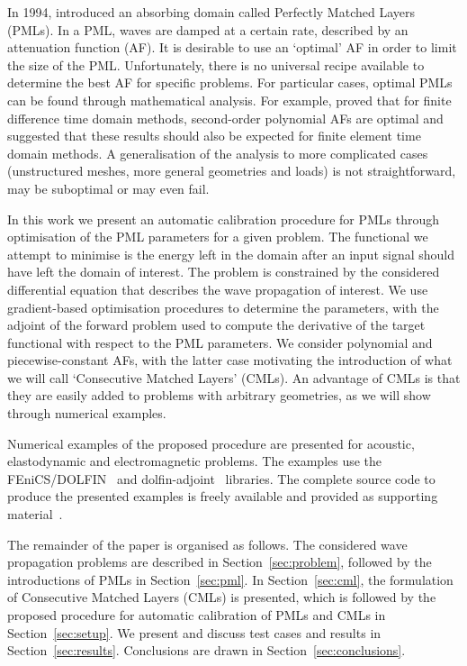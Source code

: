 \documentclass[a4paper]{article}
\begin{document}
In 1994, \citet{berenger94} introduced an absorbing domain called
Perfectly Matched Layers (PMLs).  In a PML, waves are damped at a
certain rate, described by an attenuation function (AF). It is
desirable to use an `optimal' AF in order to limit the size of the
PML.  Unfortunately, there is no universal recipe available to
determine the best AF for specific problems. For particular cases,
optimal PMLs can be found through mathematical analysis. For example,
\citet{chew96jin} proved that for finite difference time domain
methods, second-order polynomial AFs are optimal and suggested that
these results should also be expected for finite element time domain
methods. A generalisation of the analysis to more complicated cases
(unstructured meshes, more general geometries and loads) is not
straightforward, may be suboptimal or may even fail.

In this work we present an automatic calibration procedure for PMLs
through optimisation of the PML parameters for a given problem. The
functional we attempt to minimise is the energy left in the domain
after an input signal should have left the domain of interest. The
problem is constrained by the considered differential equation that
describes the wave propagation of interest.  We use gradient-based
optimisation procedures to determine the parameters, with the adjoint
of the forward problem used to compute the derivative of the target
functional with respect to the PML parameters.  We consider polynomial
and piecewise-constant AFs, with the latter case motivating the
introduction of what we will call `Consecutive Matched Layers'
(CMLs). An advantage of CMLs is that they are easily added to problems
with arbitrary geometries, as we will show through numerical examples.

Numerical examples of the proposed procedure are presented for
acoustic, elastodynamic and electromagnetic problems. The examples use
the FEniCS/DOLFIN~\citep{logg10wells, logg12etall, alnaes:2015} and
dolfin-adjoint~\citep{farrell13etall, funke13farrell} libraries. The
complete source code to produce the presented examples is freely
available and provided as supporting material~\citep{pmlcode}.

The remainder of the paper is organised as follows. The considered
wave propagation problems are described in Section~\ref{sec:problem},
followed by the introductions of PMLs in Section~\ref{sec:pml}. In
Section~\ref{sec:cml}, the formulation of Consecutive Matched Layers
(CMLs) is presented, which is followed by the proposed procedure for
automatic calibration of PMLs and CMLs in Section~\ref{sec:setup}. We
present and discuss test cases and results in
Section~\ref{sec:results}. Conclusions are drawn in
Section~\ref{sec:conclusions}.
\end{document}
